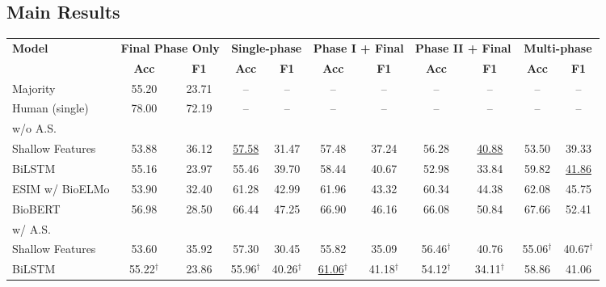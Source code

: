\documentclass[11pt,a4paper]{article}
\begin{document}
\subsection{Main Results}
\begin{table*}
    \small
    \centering
    \begin{tabular}{lcccccccccc}
        \toprule
        \multirow{2}{*}{\textbf{Model}} & 
        \multicolumn{2}{c}{\textbf{Final Phase Only}} &
        \multicolumn{2}{c}{\textbf{Single-phase}} &
        \multicolumn{2}{c}{\textbf{Phase I + Final}} &
        \multicolumn{2}{c}{\textbf{Phase II + Final}} & 
        \multicolumn{2}{c}{\textbf{Multi-phase}} \\
        \cmidrule{2-11}
        & \textbf{Acc} & \textbf{F1} & \textbf{Acc} & \textbf{F1} & \textbf{Acc} & \textbf{F1} & \textbf{Acc} & \textbf{F1} & \textbf{Acc} & \textbf{F1} \\
        \midrule
        Majority & 55.20 & 23.71 & -- & -- & -- & -- & -- & -- & -- & -- \\
        Human (single) & 78.00 & 72.19 & -- & -- & -- & -- & -- & -- & -- & -- \\
        \midrule
        w/o A.S. \\
        \midrule
        \hspace{0.1cm}Shallow Features & 53.88 & 36.12 & \underline{57.58} & 31.47 & 57.48 & 37.24 & 56.28 & \underline{40.88} & 53.50 & 39.33 \\
        \hspace{0.1cm}BiLSTM & 55.16 & 23.97 & 55.46 & 39.70 & 58.44 & 40.67 & 52.98 & 33.84 & 59.82 & \underline{41.86} \\
        \hspace{0.1cm}ESIM w/ BioELMo & 53.90 & 32.40 & 61.28 & 42.99 & 61.96 & 43.32 & 60.34 & 44.38 & 62.08 & 45.75 \\
        \hspace{0.1cm}BioBERT & 56.98 & 28.50  & 66.44 & 47.25 & 66.90 & 46.16 & 66.08 & 50.84 & 67.66 & 52.41 \\
        \midrule
        w/ A.S. \\
        \midrule
        \hspace{0.1cm}Shallow Features & 53.60 & 35.92 & 57.30 & 30.45 & 55.82 & 35.09 & 56.46$^\dagger$ & 40.76 & 55.06$^\dagger$ & 40.67$^\dagger$ \\
        \hspace{0.1cm}BiLSTM & 55.22$^\dagger$ & 23.86 & 55.96$^\dagger$ & 40.26$^\dagger$ & \underline{61.06}$^\dagger$ & 41.18$^\dagger$ & 54.12$^\dagger$ & 34.11$^\dagger$ & 58.86 & 41.06 \\

\end{tabular}
\end{table*}
\end{document}
